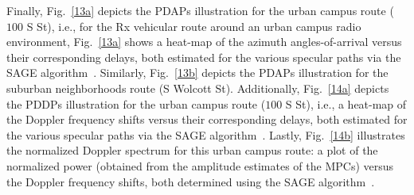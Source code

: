 \documentclass[12pt, draftcls, onecolumn]{IEEEtran}
\begin{document}
{Finally, Fig.~\ref{13a} depicts the PDAPs illustration for the urban campus route ($100$ S St), i.e., for the Rx vehicular route around an urban campus radio environment, Fig.~\ref{13a} shows a heat-map of the azimuth angles-of-arrival versus their corresponding delays, both estimated for the various specular paths via the SAGE algorithm~\cite{SAGE}. Similarly, Fig.~\ref{13b} depicts the PDAPs illustration for the suburban neighborhoods route (S Wolcott St). Additionally, Fig.~\ref{14a} depicts the PDDPs illustration for the urban campus route ($100$ S St), i.e., a heat-map of the Doppler frequency shifts versus their corresponding delays, both estimated for the various specular paths via the SAGE algorithm~\cite{SAGE}. Lastly, Fig.~\ref{14b} illustrates the normalized Doppler spectrum for this urban campus route: a plot of the normalized power (obtained from the amplitude estimates of the MPCs) versus the Doppler frequency shifts, both determined using the SAGE algorithm~\cite{SAGE}.
\vspace{-3mm}

}
\end{document}
